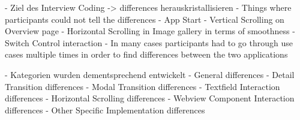 - Ziel des Interview Coding -> differences herauskristallisieren
- Things where participants could not tell the differences
    - App Start
    - Vertical Scrolling on Overview page
    - Horizontal Scrolling in Image gallery in terms of smoothness
    - Switch Control interaction
- In many cases participants had to go through use cases multiple times in order to find differences between the two applications





- Kategorien wurden dementsprechend entwickelt
    - General differences
    - Detail Transition differences
    - Modal Transition differences
    - Textfield Interaction differences
    - Horizontal Scrolling differences
    - Webview Component Interaction differences
    - Other Specific Implementation differences